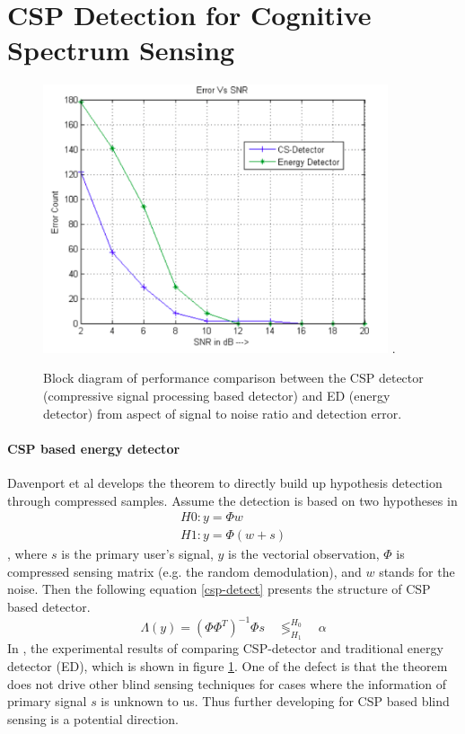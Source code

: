 \section{CSP Detection for Cognitive Spectrum Sensing}\label{sct:csp_detect}
\begin{figure}[!t]
\centering
\includegraphics[width=4.0in]{figs/csp-detec_vs_ED.png}
\DeclareGraphicsExtensions.
\caption{Block diagram of performance comparison between the CSP detector (compressive signal processing based detector) and ED (energy detector) from aspect of signal to noise ratio and detection error.}\label{csp-detec_vs_ED}
\end{figure}

\paragraph{CSP based energy detector}
\indent \indent Davenport et al \cite{davenport2010signal} develops the theorem to directly build up hypothesis detection through compressed samples. Assume the detection is based on two hypotheses in 
\begin{equation}
\begin{aligned}
H0: y = \Phi w  \\
H1: y = \Phi (w + s)
\end{aligned}
\end{equation}
, where $s$ is the primary user's signal, $y$ is the vectorial observation, $\Phi$ is compressed sensing matrix (e.g. the random demodulation), and $w$ stands for the noise. Then the following equation \ref{csp-detect} presents the structure of CSP based detector. 
\begin{equation}
\label{csp-detect}
\Lambda(y) = (\Phi \Phi^T)^{-1} \Phi s \quad \mathop{\lessgtr}_{H_1}^{H_0} \quad \alpha
\end{equation}
In \cite{appaiah2013spectrum}, the experimental results of comparing CSP-detector and traditional energy detector (ED), which is shown in figure \ref{csp-detec_vs_ED}. One of the defect is that the theorem does not drive other blind sensing techniques for cases where the information of primary signal $s$ is unknown to us. Thus further developing for CSP based blind sensing is a potential direction. 

